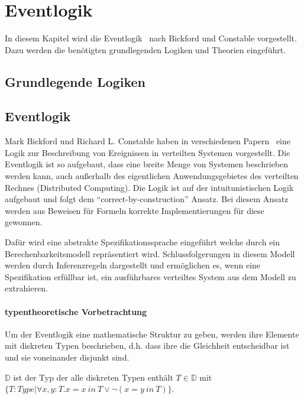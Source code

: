 \section{Eventlogik}
\label{sec_logik}

In diesem Kapitel wird die Eventlogik~\cite{bickford2003logic} nach Bickford und
Constable vorgestellt. Dazu werden die benötigten grundlegenden Logiken
und Theorien eingeführt.

\subsection{Grundlegende Logiken}

\subsection{Eventlogik}

Mark Bickford und Richard L. Constable haben in verschiedenen
Papern~\cite{bickford2003logic, bickford2005causal, bickford2009component} eine Logik zur Beschreibung
von Ereignissen in verteilten Systemen vorgestellt. Die Eventlogik ist so
aufgebaut, dass eine breite Menge von Systemen beschrieben werden kann, auch
außerhalb des eigentlichen Anwendungsgebietes des verteilten Rechnes
(Distributed Computing).  Die Logik ist auf der
intuitunistischen Logik aufgebaut und folgt dem ``correct-by-construction''
Ansatz. Bei diesem Ansatz werden aus Beweisen für Formeln korrekte Implementierungen für
diese gewonnen.~\cite{bates1985proofs}

Dafür wird eine abstrakte Spezifikationssprache eingeführt welche durch
ein Berechenbarkeitsmodell repräsentiert wird.
Schlussfolgerungen in diesem Modell werden durch Inferenzregeln dargestellt und
ermöglichen es, wenn eine Spezifikation erfüllbar ist, ein ausführbares
verteiltes System aus dem Modell zu extrahieren.~\cite{bickford2005causal}


\paragraph{typentheoretische Vorbetrachtung}
Um der Eventlogik eine mathematische Struktur zu geben, werden ihre
Elemente mit diskreten Typen beschrieben, d.h. dass ihre die Gleichheit
entscheidbar ist und sie voneinander disjunkt sind.

\begin{defi}
  $\mathbb{D}$ ist der Typ der alle diskreten Typen enthält $T\in\mathbb{D}$ mit $\{T:Type|\forall x,y : T.x = x\ in\ T \vee\neg (x = y\ in\
  T)\}$.
\end{defi}

